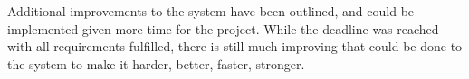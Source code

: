 \begin{Overview}
Additional improvements to the system have been outlined, and could be implemented given more time for the project.
While the deadline was reached with all requirements fulfilled, there is still much improving that could be done to the system to make it harder, better, faster, stronger.


\end{Overview}
